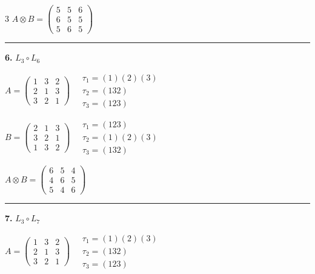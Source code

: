 \begin{multicols}{3}
$A \otimes B = \begin{pmatrix} 5 & 5 & 6 \\ 6 & 5 & 5 \\ 5 & 6 & 5 \end{pmatrix}$

\vspace{0.3em}
\hrule
\vspace{0.3em}

\noindent\textbf{6.} $L_{3} \circ L_{6}$

$A = \begin{pmatrix} 1 & 3 & 2 \\ 2 & 1 & 3 \\ 3 & 2 & 1 \end{pmatrix} \quad \begin{matrix} \tau_{1}=(1)(2)(3) \\ \tau_{2}=(1 3 2) \\ \tau_{3}=(1 2 3) \end{matrix}$

$B = \begin{pmatrix} 2 & 1 & 3 \\ 3 & 2 & 1 \\ 1 & 3 & 2 \end{pmatrix} \quad \begin{matrix} \tau_{1}=(1 2 3) \\ \tau_{2}=(1)(2)(3) \\ \tau_{3}=(1 3 2) \end{matrix}$

$A \otimes B = \begin{pmatrix} 6 & 5 & 4 \\ 4 & 6 & 5 \\ 5 & 4 & 6 \end{pmatrix}$

\vspace{0.3em}
\hrule
\vspace{0.3em}

\noindent\textbf{7.} $L_{3} \circ L_{7}$

$A = \begin{pmatrix} 1 & 3 & 2 \\ 2 & 1 & 3 \\ 3 & 2 & 1 \end{pmatrix} \quad \begin{matrix} \tau_{1}=(1)(2)(3) \\ \tau_{2}=(1 3 2) \\ \tau_{3}=(1 2 3) \end{matrix}$


\end{multicols}
